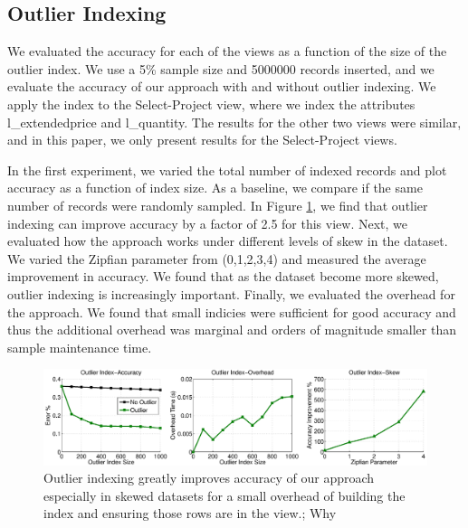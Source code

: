 \subsection{Outlier Indexing}
We evaluated the accuracy for each of the views as a function of the size of the outlier index. 
We use a 5\% sample size and 5000000 records inserted, and we evaluate the accuracy of our approach with and without outlier indexing.
We apply the index to the Select-Project view, where we index the attributes l\_extendedprice and l\_quantity.
The results for the other two views were similar, and in this paper, we only present results for the Select-Project views.

In the first experiment, we varied the total number of indexed records and plot accuracy as a function of index size.
As a baseline, we compare if the same number of records were randomly sampled.
In Figure \ref{exp7outlier}, we find that outlier indexing can improve accuracy by a factor of 2.5 for this view. 
Next, we evaluated how the approach works under different levels of skew in the dataset. 
We varied the Zipfian parameter from (0,1,2,3,4) and measured the average improvement in accuracy. 
We found that as the dataset become more skewed, outlier indexing is increasingly important.
Finally, we evaluated the overhead for the approach. 
We found that small indicies were sufficient for good accuracy and thus the additional overhead was marginal and orders of magnitude smaller than sample maintenance time. 

\begin{figure}[ht!]
\label{exp7outlier}
\hspace{-4em}
\includegraphics[scale=0.21]{exp/exp6-outlier-full.eps}
 \caption{Outlier indexing greatly improves accuracy of our approach especially in skewed datasets for a small overhead of building the index and ensuring those rows are in the view.; Why }
\end{figure}

